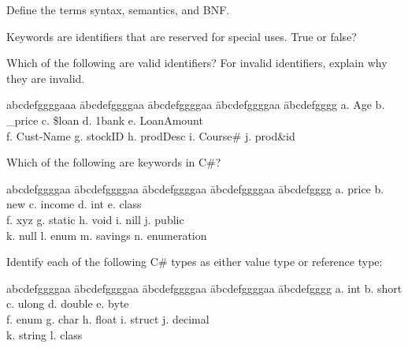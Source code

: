 {\exercisesfont

\begin{list}{E \thechapter.\theenumi}%
{ \itemsep 0.05in \parskip 0in \parsep 0in}

\item Define the terms syntax, semantics, and BNF.

\item Keywords are identifiers that are reserved for special uses.
True or false?

\item Which of the following are valid identifiers?  For invalid
identifiers, explain why they are invalid.


\begin{tabbing}
abcdefggggaaa \= abcdefggggaa \= abcdefggggaa \= abcdefggggaa \=
abcdefgggg
 \kill
  a. Age \> b. \_price \> c. \$loan \> d. 1bank \> e. LoanAmount \\
  f. Cust-Name \> g. stockID \> h. prodDesc \> i. Course\# \> j. prod\&id
\end{tabbing}


\item Which of the following are keywords in C\#?


\begin{tabbing}
abcdefggggaa \= abcdefggggaa \= abcdefggggaa \= abcdefggggaa \=
abcdefgggg
 \kill
  a. price \> b. new \> c. income \> d. int \> e. class \\
  f. xyz \> g. static \> h. void \> i. nill \> j. public \\
  k. null \> l. enum \> m. savings \> n. enumeration \>
\end{tabbing}



\item Identify each of the following C\# types as either value
type or reference type:


\begin{tabbing}
abcdefggggaa \= abcdefggggaa \= abcdefggggaa \= abcdefggggaa \=
abcdefgggg
 \kill
  a. int \> b. short \> c. ulong \> d. double \> e. byte \\
  f. enum \> g. char \> h. float \> i. struct \> j. decimal \\
  k. string \> l. class \>   \>   \>
\end{tabbing}



\end{list}}
